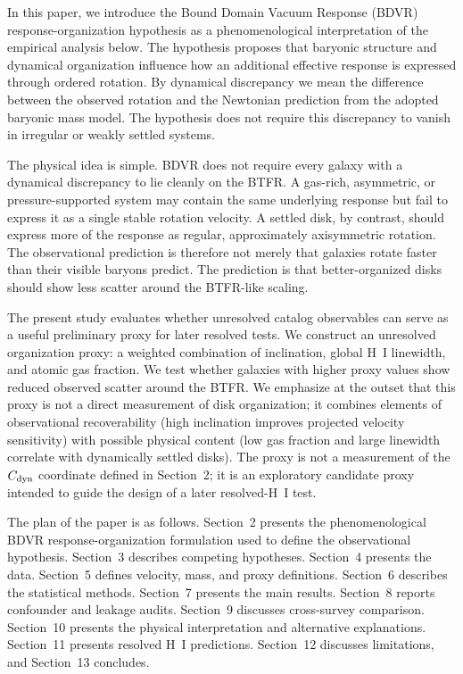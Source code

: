 \documentclass[11pt]{article}
\begin{document}
In this paper, we introduce the Bound Domain Vacuum Response (BDVR) response-organization hypothesis as a phenomenological interpretation of the empirical analysis below. The hypothesis proposes that baryonic structure and dynamical organization influence how an additional effective response is expressed through ordered rotation. By dynamical discrepancy we mean the difference between the observed rotation and the Newtonian prediction from the adopted baryonic mass model. The hypothesis does not require this discrepancy to vanish in irregular or weakly settled systems.

The physical idea is simple. BDVR does not require every galaxy with a dynamical discrepancy to lie cleanly on the BTFR. A gas-rich, asymmetric, or pressure-supported system may contain the same underlying response but fail to express it as a single stable rotation velocity. A settled disk, by contrast, should express more of the response as regular, approximately axisymmetric rotation. The observational prediction is therefore not merely that galaxies rotate faster than their visible baryons predict. The prediction is that better-organized disks should show less scatter around the BTFR-like scaling.

The present study evaluates whether unresolved catalog observables can serve as a useful preliminary proxy for later resolved tests. We construct an unresolved organization proxy: a weighted combination of inclination, global H~I linewidth, and atomic gas fraction. We test whether galaxies with higher proxy values show reduced observed scatter around the BTFR. We emphasize at the outset that this proxy is not a direct measurement of disk organization; it combines elements of observational recoverability (high inclination improves projected velocity sensitivity) with possible physical content (low gas fraction and large linewidth correlate with dynamically settled disks). The proxy is not a measurement of the $C_{\rm dyn}$ coordinate defined in Section~2; it is an exploratory candidate proxy intended to guide the design of a later resolved-H~I test.

The plan of the paper is as follows. Section~2 presents the phenomenological BDVR response-organization formulation used to define the observational hypothesis. Section~3 describes competing hypotheses. Section~4 presents the data. Section~5 defines velocity, mass, and proxy definitions. Section~6 describes the statistical methods. Section~7 presents the main results. Section~8 reports confounder and leakage audits. Section~9 discusses cross-survey comparison. Section~10 presents the physical interpretation and alternative explanations. Section~11 presents resolved H~I predictions. Section~12 discusses limitations, and Section~13 concludes.
\end{document}
